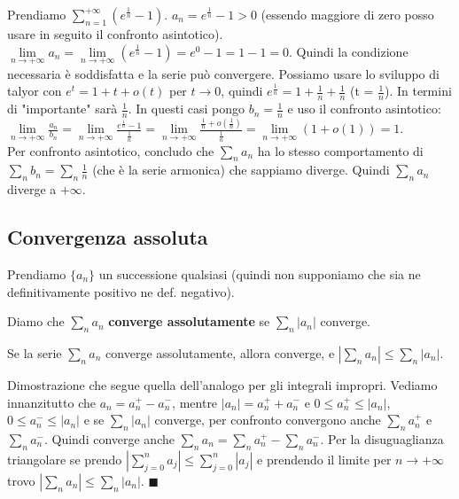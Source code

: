 \begin{example}
Prendiamo $\sum_{n=1}^{+\infty}(e^{\frac{1}{n}} - 1)$. $a_n = e^{\frac{1}{n}} - 1 > 0$ (essendo maggiore di zero posso usare in seguito il confronto asintotico).\\
$\lim\limits_{n\to +\infty}a_n = \lim\limits_{n\to +\infty}(e^{\frac{1}{n}}-1) = e^0 - 1 = 1 - 1 = 0$. Quindi la condizione necessaria è soddisfatta e la serie può convergere. Possiamo usare lo sviluppo di talyor con $e^t = 1 + t + o(t)$ per $t\to 0$, quindi $e^{\frac{1}{n}} = 1 + \frac{1}{n} + \frac{1}{n}$ (t = $\frac{1}{n}$).
In termini di "importante" sarà $\frac{1}{n}$. In questi casi pongo $b_n = \frac{1}{n}$ e uso il confronto asintotico:\\
$\lim\limits_{n \to +\infty}\frac{a_n}{b_n} = \lim\limits_{n \to +\infty}\frac{e^{\frac{1}{n}}-1}{\frac{1}{n}} = \lim\limits_{n \to +\infty} \frac{\frac{1}{n} + o(\frac{1}{n})}{\frac{1}{n}} = \lim\limits_{n \to +\infty}(1 + o(1)) = 1$. \\
Per confronto asintotico, concludo che $\sum_n a_n$ ha lo stesso comportamento di $\sum_n b_n = \sum_n \frac{1}{n}$ (che è la serie armonica) che sappiamo diverge. Quindi $\sum_n a_n$ diverge a $+\infty$.
\end{example}

\subsection{Convergenza assoluta}
Prendiamo $\{a_n\}$ un successione qualsiasi (quindi non supponiamo che sia ne definitivamente positivo ne def. negativo).
\begin{definition}
Diamo che $\sum_n a_n$ \textbf{converge assolutamente} se $\sum_n |a_n|$ converge.
\end{definition}

\begin{theorem}
Se la serie $\sum_n a_n$ converge assolutamente, allora converge, e $|\sum_n a_n| \leq \sum_n |a_n|$.
\end{theorem}

\begin{demostration}
Dimostrazione che segue quella dell'analogo per gli integrali impropri. Vediamo innanzitutto che $a_n = a_n^+ - a_n^-$, mentre $|a_n| = a_n^+ + a_n^-$ e $0 \leq a_n^+ \leq |a_n|$, $0 \leq a_n^- \leq |a_n|$ e se $\sum_n |a_n|$ converge, per confronto convergono anche $\sum_n a_n^+$ e $\sum_n a_n^-$. Quindi converge anche $\sum_n a_n = \sum_n a_n^+ - \sum_n a_n^-$. Per la disuguaglianza triangolare se prendo $|\sum_{j=0}^n a_j| \leq \sum_{j=0}^n |a_j|$ e prendendo il limite per $n\to +\infty$ trovo $|\sum_n a_n| \leq \sum_n |a_n|$. $\blacksquare$
\end{demostration}

